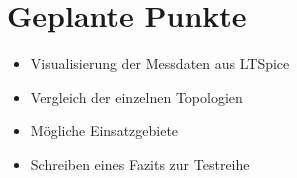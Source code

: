 \section{Geplante Punkte}


\begin{itemize}
  \item Visualisierung der Messdaten aus LTSpice
  \item Vergleich der einzelnen Topologien
  \item Mögliche Einsatzgebiete
  \item Schreiben eines Fazits zur Testreihe
\end{itemize}

